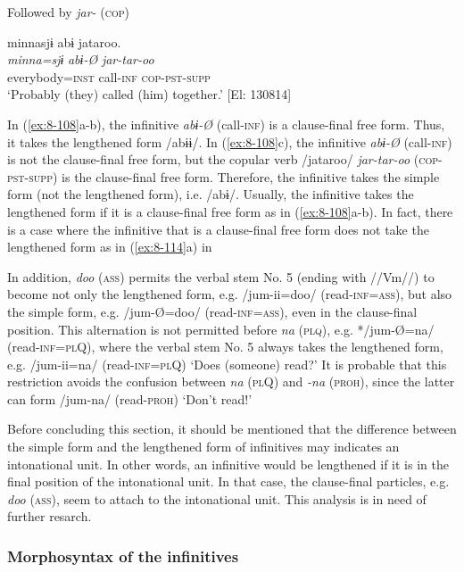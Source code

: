 \ex  Followed by \textit{jar-} (\textsc{cop})

{\TM}
\glll  minnasjɨ  abɨ  jataroo.\\
\textit{minna=sjɨ}  \textit{abɨ-Ø}  \textit{jar-tar-oo}\\
everybody=\textsc{inst}  call-\textsc{inf}  \textsc{cop}-\textsc{pst}-\textsc{supp}\\
\glt ‘Probably (they) called (him) together.’ [El: 130814]
\z
\z

In (\ref{ex:8-108}a-b), the infinitive \textit{abɨ-Ø} (call-\textsc{inf}) is a clause-final free form. Thus, it takes the lengthened form /abɨɨ/. In (\ref{ex:8-108}c), the infinitive \textit{abɨ-Ø} (call-\textsc{inf}) is not the clause-final free form, but the copular verb /jataroo/ \textit{jar-tar-oo} (\textsc{cop}-\textsc{pst}-\textsc{supp}) is the clause-final free form. Therefore, the infinitive takes the simple form (not the lengthened form), i.e. /abɨ/. Usually, the infinitive takes the lengthened form if it is a clause-final free form as in (\ref{ex:8-108}a-b). In fact, there is a case where the infinitive that is a clause-final free form does not take the lengthened form as in (\ref{ex:8-114}a) in 

  In addition, \textit{doo} (\textsc{ass}) permits the verbal stem No. 5 (ending with //Vm//) to become not only the lengthened form, e.g. /jum-ii=doo/ (read-\textsc{inf}=\textsc{ass}), but also the simple form, e.g. /jum-Ø=doo/ (read-\textsc{inf}=\textsc{ass}), even in the clause-final position. This alternation is not permitted before \textit{na} (\textsc{plq}), e.g. */jum-Ø=na/ (read-\textsc{inf}=\textsc{pl}Q), where the verbal stem No. 5 always takes the lengthened form, e.g. /jum-ii=na/ (read-\textsc{inf}=\textsc{pl}Q) ‘Does (someone) read?’ It is probable that this restriction avoids the confusion between \textit{na} (\textsc{pl}Q) and \textit{-na} (\textsc{proh}), since the latter can form /jum-na/ (read-\textsc{proh}) ‘Don’t read!’

  Before concluding this section, it should be mentioned that the difference between the simple form and the lengthened form of infinitives may indicates an intonational unit. In other words, an infinitive would be lengthened if it is in the final position of the intonational unit. In that case, the clause-final particles, e.g. \textit{doo} (\textsc{ass}), seem to attach to the intonational unit. This analysis is in need of further resarch.

\subsubsection{Morphosyntax of the infinitives}

